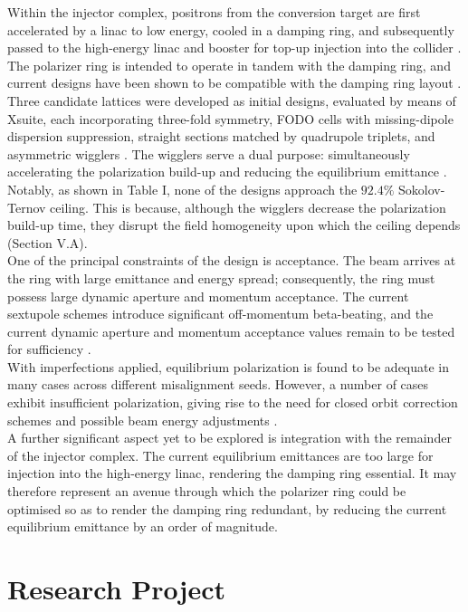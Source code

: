 \documentclass[%
 aip,
 amsmath,amssymb,
 reprint,%
superscriptaddress
]{revtex4-2}
\begin{document}
Within the injector complex, positrons from the conversion target are first accelerated by a linac to low energy, cooled in a damping ring, and subsequently passed to the high-energy linac and booster for top-up injection into the collider \cite{Ogur:2713264}.
The polarizer ring is intended to operate in tandem with the damping ring, and current designs have been shown to be compatible with the damping ring layout \cite{keskar_bartosik_carli_2026}.
Three candidate lattices were developed as initial designs, evaluated by means of Xsuite, each incorporating three-fold symmetry, FODO cells with missing-dipole dispersion suppression, straight sections matched by quadrupole triplets, and asymmetric wigglers \cite{keskar_bartosik_carli_2026}.
The wigglers serve a dual purpose: simultaneously accelerating the polarization build-up and reducing the equilibrium emittance \cite{keskar_bartosik_carli_2026}.
\\
Notably, as shown in Table I, none of the designs approach the $92.4\%$ Sokolov-Ternov ceiling.
This is because, although the wigglers decrease the polarization build-up time, they disrupt the field homogeneity upon which the ceiling depends (Section V.A).
\\
One of the principal constraints of the design is acceptance.
The beam arrives at the ring with large emittance and energy spread; consequently, the ring must possess large dynamic aperture and momentum acceptance.
The current sextupole schemes introduce significant off-momentum beta-beating, and the current dynamic aperture and momentum acceptance values remain to be tested for sufficiency \cite{keskar_bartosik_carli_2026}.
\\
With imperfections applied, equilibrium polarization is found to be adequate in many cases across different misalignment seeds.
However, a number of cases exhibit insufficient polarization, giving rise to the need for closed orbit correction schemes and possible beam energy adjustments \cite{keskar_bartosik_carli_2026}.
\\
A further significant aspect yet to be explored is integration with the remainder of the injector complex.
The current equilibrium emittances are too large for injection into the high-energy linac, rendering the damping ring essential.
It may therefore represent an avenue through which the polarizer ring could be optimised so as to render the damping ring redundant, by reducing the current equilibrium emittance by an order of magnitude.
\section{Research Project}
\end{document}
